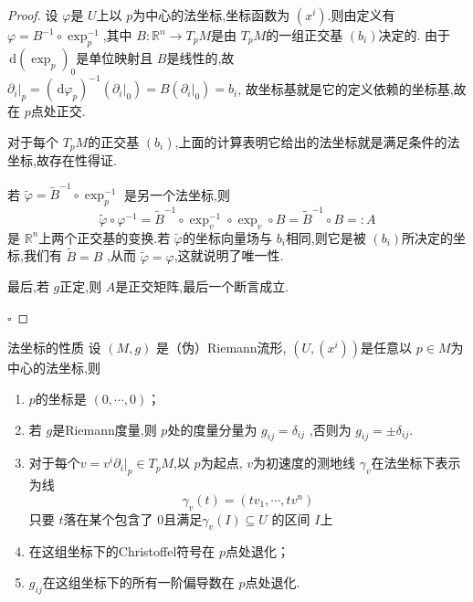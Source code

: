\documentclass[../../几何与拓扑.tex]{subfiles}
\begin{document}
\begin{proof}
    设 \(   \varphi   \)是 \(  U  \)上以 \(  p  \)为中心的法坐标,坐标函数为 \(  \left( x^{i} \right)   \).则由定义有 \(   \varphi  =  B^{-1} \circ \exp _{p}^{-1}   \),其中 \(  B:\mathbb{R} ^{n}\to T_{p}M  \)是由 \(  T_{p}M  \)的一组正交基 \(  \left( b_{i} \right)   \)决定的.      由于 \(  \,\mathrm{d} \left( \exp _{p} \right)_{0}   \)是单位映射且 \(  B  \)是线性的,故  \( \partial _{i}|_{p}=  \left( \,\mathrm{d}  \varphi _{p} \right)^{-1} \left( \partial _{i}|_{0} \right)= B\left( \partial _{i}|_{0} \right)= b_{i}     \),  
    故坐标基就是它的定义依赖的坐标基,故在 \(  p  \)点处正交.
    
    对于每个 \(  T_{p}M  \)的正交基 \(  \left( b_{i} \right)   \),上面的计算表明它给出的法坐标就是满足条件的法坐标,故存在性得证.  
    
    若 \(   \tilde{\varphi} = \tilde{B}^{-1} \circ \exp _{p}^{-1}   \) 是另一个法坐标,则 \[
     \tilde{\varphi} \circ  \varphi ^{-1} = \tilde{B}^{-1} \circ \exp _{v}^{-1} \circ \exp _{v}\circ B =  \tilde{B}^{-1} \circ B= :A
    \]是 \(  \mathbb{R} ^{n}  \)上两个正交基的变换.若 \(   \tilde{\varphi}   \)的坐标向量场与 \(  b_{i}  \)相同,则它是被 \(  \left( b_{i} \right)   \)所决定的坐标,我们有 \(  \tilde{B}= B  \) ,从而 \(   \tilde{\varphi} =  \varphi   \),这就说明了唯一性.    
    
    最后,若 \(  g  \)正定,则 \(  A  \)是正交矩阵,最后一个断言成立.  

    \hfill $\square$
\end{proof}

\begin{proposition}{法坐标的性质}
    设 \(  \left( M,g \right)   \) 是（伪）Riemann流形, \(  \left( U,\left( x^{i} \right)  \right)   \)是任意以 \(  p \in M  \)为中心的法坐标,则
    \begin{enumerate}
        \item  \(  p  \)的坐标是 \(  \left( 0,\cdots ,0 \right)   \)；
        \item  若 \(  g  \)是Riemann度量,则  \(  p  \)处的度量分量为 \(  g_{ij}=  \delta  _{ij}  \)  ,否则为 \(  g_{ij}= \pm  \delta  _{ij}  \).
        \item 对于每个\(  v = v^{i}\partial _{i}|_{p}\in T_{p}M  \),以 \(  p  \)为起点, \(  v  \)为初速度的测地线 \(   \gamma _{v}  \)在法坐标下表示为线 \[
         \gamma _{v}\left( t \right)= \left( tv_1,\cdots ,tv^{n} \right)  
        \]     只要 \(  t  \)落在某个包含了 \(  0  \)且满足\(   \gamma _{v}\left( I \right)\subseteq U   \) 的区间 \(  I  \)上
        \item 在这组坐标下的Christoffel符号在 \(  p  \)点处退化； 
        \item  \(  g_{ij}  \)在这组坐标下的所有一阶偏导数在 \(  p  \)点处退化.  
    \end{enumerate}
      
\end{proposition}
\end{document}
